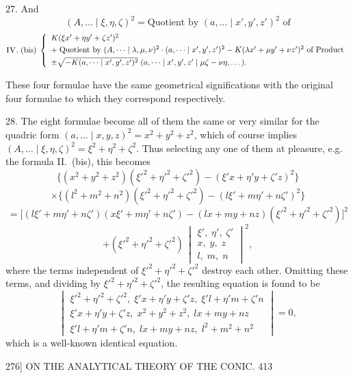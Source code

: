 \documentclass[11pt]{article}
\begin{document}
\textsc{27.} And
\[ (A,\dots \mid \xi,\eta,\zeta)^{2}=\text{Quotient by }(a,\dots \mid x',y',z')^{2}\text{ of} \]
\[ \textsc{IV.}\;(\text{bis})\;\left\{\begin{array}{l}
K(\xi x'+\eta y'+\zeta z')^{2}\\[0.3em]
+\;\text{Quotient by }(A,\dots \mid \lambda,\mu,\nu)^{2}\cdot(a,\dots \mid x',y',z')^{2}-K(\lambda x'+\mu y'+\nu z')^{2}\text{ of Product}\\[0.3em]
\pm\sqrt{-K(a,\dots \mid x',y',z')^{2}}\;(a,\dots \mid x',y',z' \mid \mu\zeta-\nu\eta,\dots).
\end{array}\right. \]

These four formulae have the same geometrical significations with the original four
formulae to which they correspond respectively.

\textsc{28.} The eight formulae become all of them the same or very similar for the quadric
form $(a,\dots \mid x,y,z)^{2}=x^{2}+y^{2}+z^{2}$, which of course implies $(A,\dots \mid \xi,\eta,\zeta)^{2}=\xi^{2}+\eta^{2}+\zeta^{2}$.
Thus selecting any one of them at pleasure, e.g. the formula \textsc{II.}~(bis), this becomes
\[ \bigl\{(x^{2}+y^{2}+z^{2})(\xi'^{2}+\eta'^{2}+\zeta'^{2})-(\xi' x+\eta' y+\zeta' z)^{2}\bigr\} \]
\[ \times\bigl\{(l^{2}+m^{2}+n^{2})(\xi'^{2}+\eta'^{2}+\zeta'^{2})-(l\xi'+m\eta'+n\zeta')^{2}\bigr\} \]
\[ =\bigl[(l\xi'+m\eta'+n\zeta')(x\xi'+m\eta'+n\zeta')-(lx+my+nz)(\xi'^{2}+\eta'^{2}+\zeta'^{2})\bigr]^{2} \]
\[ +(\xi'^{2}+\eta'^{2}+\zeta'^{2})\,\begin{vmatrix}
\xi',\;\eta',\;\zeta'\\ x,\;y,\;z\\ l,\;m,\;n
\end{vmatrix}^{2}, \]
where the terms independent of $\xi'^{2}+\eta'^{2}+\zeta'^{2}$ destroy each other. Omitting these terms,
and dividing by $\xi'^{2}+\eta'^{2}+\zeta'^{2}$, the resulting equation is found to be
\[ \begin{vmatrix}
\xi'^{2}+\eta'^{2}+\zeta'^{2},\;\xi' x+\eta' y+\zeta' z,\;\xi' l+\eta' m+\zeta' n\\
\xi' x+\eta' y+\zeta' z,\;x^{2}+y^{2}+z^{2},\;lx+my+nz\\
\xi' l+\eta' m+\zeta' n,\;lx+my+nz,\;l^{2}+m^{2}+n^{2}
\end{vmatrix}=0, \]
which is a well-known identical equation.

\begin{center}
\textsc{276]} \hfill ON THE ANALYTICAL THEORY OF THE CONIC. \hfill 413
\end{center}
\end{document}
